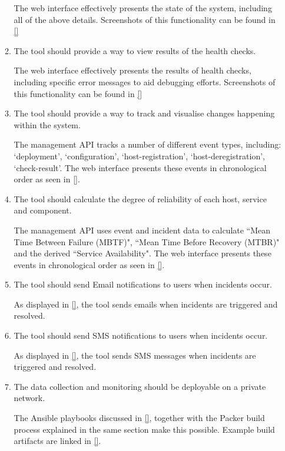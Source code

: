 \documentclass{cshonours}
\begin{document}
\begin{enumerate}
\begin{enumerate}
        The web interface effectively presents the state of the system, including all of the above details. Screenshots of this functionality can be found in \ref{}

      \item The tool should provide a way to view results of the health checks.

        The web interface effectively presents the results of health checks, including specific error messages to aid debugging efforts. Screenshots of this functionality can be found in \ref{}

      \item The tool should provide a way to track and visualise changes happening within the system.

        The management API tracks a number of different event types, including: `deployment', `configuration', `host-registration', `host-deregistration', `check-result'. The web interface presents these events in chronological order as seen in \ref{}.

      \item The tool should calculate the degree of reliability of each host, service and component.

        The management API uses event and incident data to calculate ``Mean Time Between Failure (MBTF)", ``Mean Time Before Recovery (MTBR)" and the derived ``Service Availability". The web interface presents these events in chronological order as seen in \ref{}.

      \item The tool should send Email notifications to users when incidents occur.

        As displayed in \ref{}, the tool sends emails when incidents are triggered and resolved.

      \item The tool should send SMS notifications to users when incidents occur.

        As displayed in \ref{}, the tool sends SMS messages when incidents are triggered and resolved.

      \item The data collection and monitoring should be deployable on a private network.

        The Ansible playbooks discussed in \ref{}, together with the Packer build process explained in the same section make this possible. Example build artifacts are linked in \ref{}.

    \end{enumerate}
\end{enumerate}
\end{document}
